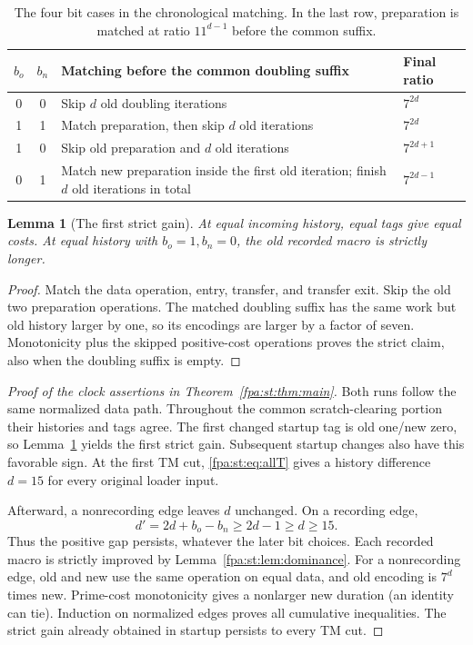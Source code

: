\documentclass[11pt,a4paper]{article}
\numberwithin{equation}{section}
\newtheorem{lemma}[theorem]{Lemma}
\begin{document}
\begin{table}[htbp]
\centering\small
\begin{tabular}{@{}ccp{66mm}l@{}}
\toprule
$b_o$ & $b_n$ & Matching before the common doubling suffix & Final ratio\\
\midrule
0&0&Skip $d$ old doubling iterations &$7^{2d}$\\
1&1&Match preparation, then skip $d$ old iterations &$7^{2d}$\\
1&0&Skip old preparation and $d$ old iterations &$7^{2d+1}$\\
0&1&Match new preparation inside the first old iteration; finish $d$ old iterations in total &$7^{2d-1}$\\
\bottomrule
\end{tabular}
\caption{The four bit cases in the chronological matching. In the last row,
preparation is matched at ratio $11^{d-1}$ before the common suffix.}
\label{fpa:st:tab:embedding}
\end{table}

\begin{lemma}[The first strict gain]
\label{fpa:st:lem:first}
At equal incoming history, equal tags give equal costs. At equal history
with $b_o=1,b_n=0$, the old recorded macro is strictly longer.
\end{lemma}
\begin{proof}
Match the data operation, entry, transfer, and transfer exit. Skip the old
two preparation operations. The matched doubling suffix has the same work
but old history larger by one, so its encodings are larger by a factor of
seven. Monotonicity plus the skipped positive-cost operations proves the
strict claim, also when the doubling suffix is empty.
\end{proof}

\begin{proof}[Proof of the clock assertions in Theorem~\ref{fpa:st:thm:main}]
Both runs follow the same normalized data path. Throughout the common
scratch-clearing portion their histories and tags agree. The first changed
startup tag is old one/new zero, so Lemma~\ref{fpa:st:lem:first} yields the first
strict gain. Subsequent startup changes also have this favorable sign.
At the first TM cut, \eqref{fpa:st:eq:allT} gives a history difference $d=15$ for
every original loader input.

Afterward, a nonrecording edge leaves $d$ unchanged. On a recording edge,
\begin{equation}
 d'=2d+b_o-b_n\geq2d-1\geq d\geq15.
 \label{fpa:st:eq:gap}
\end{equation}
Thus the positive gap persists, whatever the later bit choices. Each
recorded macro is strictly improved by Lemma~\ref{fpa:st:lem:dominance}. For a
nonrecording edge, old and new use the same operation on equal data, and
old encoding is $7^d$ times new. Prime-cost monotonicity gives a nonlarger
new duration (an identity can tie). Induction on normalized edges proves
all cumulative inequalities. The strict gain already obtained in startup
persists to every TM cut.
\end{proof}
\end{document}
